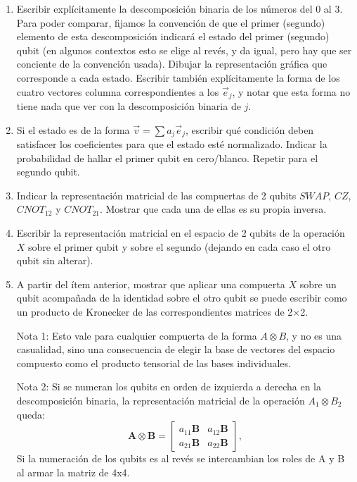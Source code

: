 \documentclass[a4paper,11pt,spanish]{article}
\begin{document}
\begin{enumerate}
  \begin{enumerate}
   \item Escribir expl\'icitamente la descomposici\'on binaria de los n\'umeros del 0 al 3. Para poder comparar, fijamos la convención de que el primer (segundo) elemento de esta descomposición indicará el estado del primer (segundo) qubit (en algunos contextos esto se elige al revés, y da igual, pero hay que ser conciente de la convención usada). Dibujar la representación gráfica que corresponde a cada estado. Escribir tambi\'en expl\'icitamente la forma de los cuatro vectores columna correspondientes a los $\vec e_j$, y notar que esta forma no tiene nada que ver con la descomposici\'on binaria de $j$.
   \item Si el estado es de la forma $\vec v = \sum a_j \vec e_j$, escribir qu\'e condici\'on deben satisfacer los coeficientes para que el estado est\'e normalizado. Indicar la probabilidad de hallar el primer qubit en cero/blanco. Repetir para el segundo qubit.
   \item Indicar la representaci\'on matricial de las compuertas de 2 qubits $SWAP$, $CZ$, $CNOT_{12}$ y $CNOT_{21}$. Mostrar que cada una de ellas es su propia inversa.
   \item Escribir la representaci\'on matricial en el espacio de 2 qubits de la operaci\'on $X$ sobre el primer qubit y sobre el segundo (dejando en cada caso el otro qubit sin alterar). 
   
   \item A partir del ítem anterior, mostrar que aplicar una compuerta $X$ sobre un qubit acompa\~nada de la identidad sobre el otro qubit se puede escribir como un producto de Kronecker de las correspondientes matrices de 2$\times$2. 
   
   Nota 1: Esto vale para cualquier compuerta de la forma $A\otimes B$, y no es una casualidad, sino una consecuencia de elegir la base de vectores del espacio compuesto como el producto tensorial de las bases individuales.
   
   Nota 2: Si se numeran los qubits en orden de izquierda a derecha en la descomposición binaria, la representaci\'on matricial de la operación $A_1\otimes B_2$ queda:
   $${\displaystyle \mathbf {A} \otimes \mathbf {B} ={\begin{bmatrix}a_{11}\mathbf {B} & a_{12} \mathbf {B} \\ a_{21}\mathbf {B} & a_{22} \mathbf {B} \end{bmatrix}},}$$
   Si la numeración de los qubits es al revés se intercambian los roles de A y B al armar la matriz de 4x4.
   

\end{enumerate}
\end{enumerate}
\end{document}
